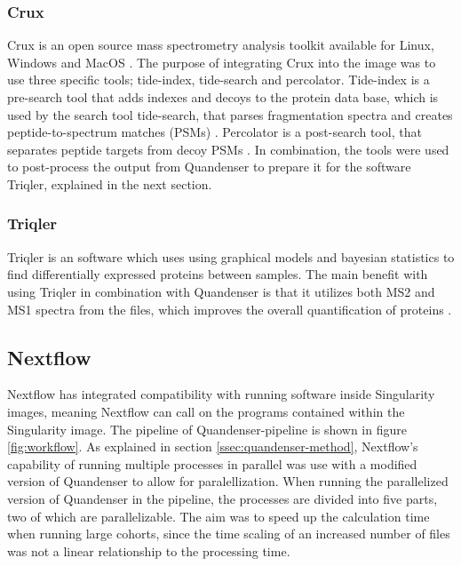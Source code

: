 \subsubsection{Crux}
Crux is an open source mass spectrometry analysis toolkit available for Linux, Windows and MacOS \cite{crux}. The purpose of integrating Crux into the image was to use three specific tools; tide-index, tide-search and percolator. Tide-index is a pre-search tool that adds indexes and decoys to the protein data base, which is used by the search tool tide-search, that parses fragmentation spectra and creates peptide-to-spectrum matches (PSMs) \cite{tide-search}. Percolator is a post-search tool, that separates peptide targets from decoy PSMs \cite{percolator}. In combination, the tools were used to post-process the output from Quandenser to prepare it for the software Triqler, explained in the next section.

\subsubsection{Triqler}
Triqler is an software which uses using graphical models and bayesian statistics to find differentially expressed proteins between samples. The main benefit with using Triqler in combination with Quandenser is that it utilizes both MS2 and MS1 spectra from the files, which improves the overall quantification of proteins \cite{triqler}.



\subsection{Nextflow}
Nextflow has integrated compatibility with running software inside Singularity images, meaning Nextflow can call on the programs contained within the Singularity image. The pipeline of Quandenser-pipeline is shown in figure \ref{fig:workflow}. As explained in section \ref{ssec:quandenser-method}, Nextflow's capability of running multiple processes in parallel was use with a modified version of Quandenser to allow for paralellization. When running the parallelized version of Quandenser in the pipeline, the processes are divided into five parts, two of which are parallelizable. The aim was to speed up the calculation time when running large cohorts, since the time scaling of an increased number of files was not a linear relationship to the processing time.

